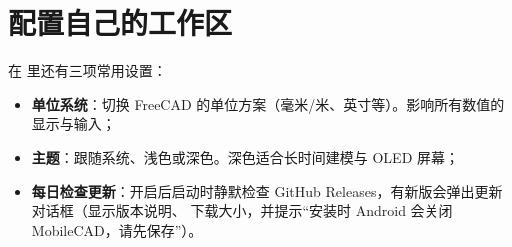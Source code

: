 \section{配置自己的工作区}

在  里还有三项常用设置：

\begin{itemize}
  \item \textbf{单位系统}：切换 FreeCAD 的单位方案（毫米/米、英寸等）。影响所有数值的显示与输入；
  \item \textbf{主题}：跟随系统、浅色或深色。深色适合长时间建模与 OLED 屏幕；
  \item \textbf{每日检查更新}：开启后启动时静默检查 GitHub Releases，有新版会弹出更新对话框（显示版本说明、
        下载大小，并提示“安装时 Android 会关闭 MobileCAD，请先保存”）。
\end{itemize}

